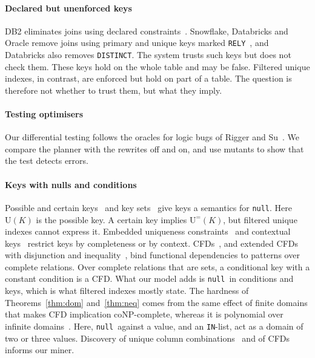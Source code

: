 \documentclass[conference]{IEEEtran}
\theoremstyle{definition}
\newcommand{\sql}[1]{\texttt{#1}}
\newcommand{\nul}{\texttt{null}}
\newcommand{\U}[1]{\mathrm{U}(#1)}
\newcommand{\Ueq}[1]{\mathrm{U}^{=}(#1)}
\begin{document}
\paragraph*{Declared but unenforced keys} DB2 eliminates joins using declared constraints~\cite{CGK99}. Snowflake,
Databricks and Oracle remove joins using primary and unique keys marked \sql{RELY}~\cite{RELYsf,RELYdb,RELYora}, and
Databricks also removes \sql{DISTINCT}. The system trusts such keys but does not check them. These keys hold on the whole
table and may be false. Filtered unique indexes, in contrast, are enforced but hold on part of a table. The question
is therefore not whether to trust them, but what they imply.

\paragraph*{Testing optimisers} Our differential testing follows the oracles for logic bugs of Rigger and
Su~\cite{RS20a,RS20b,RS20c}. We compare the planner with the rewrites off and on, and use mutants to show that the test
detects errors.

\paragraph*{Keys with nulls and conditions} Possible and certain keys~\cite{KLZ15,KLLZ16} and key
sets~\cite{Thalheim89,HLL11,HLL23} give keys a semantics for \nul. Here $\U{K}$ is the possible key. A certain key implies
$\Ueq{K}$, but filtered unique indexes cannot express it. Embedded uniqueness constraints~\cite{WLL19} and contextual
keys~\cite{WLL17} restrict keys by completeness or by context. CFDs~\cite{BFGJK07,FGJK08}, and extended CFDs with
disjunction and inequality~\cite{BFGM08}, bind functional dependencies to patterns over complete relations. Over complete
relations that are sets, a conditional key with a constant condition is a CFD. What our model adds is \nul\ in conditions
and keys, which is what filtered indexes mostly state. The hardness of Theorems~\ref{thm:dom} and~\ref{thm:neq} comes from
the same effect of finite domains that makes CFD implication coNP-complete, whereas it is polynomial over infinite
domains~\cite{FGJK08}.
Here, \nul\ against a value, and an \sql{IN}-list, act as a domain of two or three values. Discovery of unique column
combinations~\cite{PN17,BBFNPS20,AGN15} and of CFDs~\cite{FGLX11} informs our miner.


\end{document}
